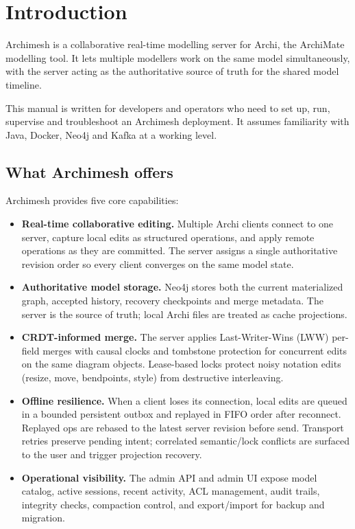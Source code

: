 \section{Introduction}
\label{sec:Introduction}

Archimesh is a collaborative real-time modelling server for Archi, the ArchiMate
modelling tool. It lets multiple modellers work on the same model simultaneously,
with the server acting as the authoritative source of truth for the shared model
timeline.

This manual is written for developers and operators who need to set up, run,
supervise and troubleshoot an Archimesh deployment. It assumes familiarity with
Java, Docker, Neo4j and Kafka at a working level.

\subsection{What Archimesh offers}

Archimesh provides five core capabilities:

\begin{itemize}
\item \textbf{Real-time collaborative editing.} Multiple Archi clients connect to
  one server, capture local edits as structured operations, and apply remote
  operations as they are committed. The server assigns a single authoritative
  revision order so every client converges on the same model state.

\item \textbf{Authoritative model storage.} Neo4j stores both the current
  materialized graph, accepted history, recovery checkpoints and merge metadata. The server is the
  source of truth; local Archi files are treated as cache projections.

\item \textbf{CRDT-informed merge.} The server applies Last-Writer-Wins (LWW)
  per-field merges with causal clocks and tombstone protection for concurrent
  edits on the same diagram objects. Lease-based locks protect noisy notation
  edits (resize, move, bendpoints, style) from destructive interleaving.

\item \textbf{Offline resilience.} When a client loses its connection, local
  edits are queued in a bounded persistent outbox and replayed in FIFO order
  after reconnect. Replayed ops are rebased to the latest server revision before
  send. Transport retries preserve pending intent; correlated semantic/lock
  conflicts are surfaced to the user and trigger projection recovery.

\item \textbf{Operational visibility.} The admin API and admin UI expose model
  catalog, active sessions, recent activity, ACL management, audit trails,
  integrity checks, compaction control, and export/import for backup and
  migration.

\end{itemize}

